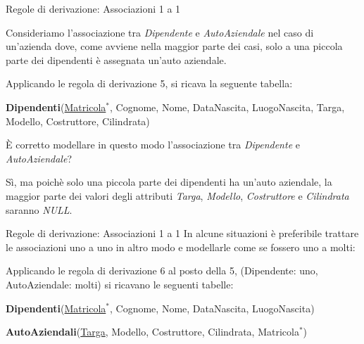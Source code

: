 \begin{frame}{Regole di derivazione: Associazioni 1 a 1}
\begin{minipage}{0.9\textwidth}
Consideriamo l'associazione tra \textit{Dipendente} e \textit{AutoAziendale} nel caso di un'azienda dove, come avviene nella maggior parte dei casi, solo a una piccola parte dei dipendenti \`e assegnata un'auto aziendale.
\end{minipage}
\pause
\begin{center}
\ERDipendenteAutoAziendale
\end{center}
\pause

Applicando le regola di derivazione 5, si ricava la seguente tabella:
\pause

\textbf{Dipendenti}(\underline{Matricola}$^*$, Cognome, Nome, DataNascita, LuogoNascita, Targa, Modello, Costruttore, Cilindrata)
\pause

\`E corretto modellare in questo modo l'associazione tra \textit{Dipendente} e \textit{AutoAziendale}?
\pause

S\`i, ma poich\`e solo una piccola parte dei dipendenti ha un'auto aziendale, la maggior parte dei valori degli attributi \textit{Targa}, \textit{Modello}, \textit{Costruttore} e \textit{Cilindrata} saranno \textit{NULL}.
\end{frame}
%
\begin{frame}{Regole di derivazione: Associazioni 1 a 1}
In alcune situazioni \`e preferibile trattare le associazioni uno a uno in altro modo e modellarle come se fossero uno a molti:
\pause
\begin{center}
\ERDipendenteAutoAziendale
\end{center}
\pause

Applicando le regola di derivazione 6 al posto della 5, (Dipendente: uno, AutoAziendale: molti) si ricavano le seguenti tabelle:
\pause

\textbf{Dipendenti}(\underline{Matricola}$^*$, Cognome, Nome, DataNascita, LuogoNascita)
\pause

\textbf{AutoAziendali}(\underline{Targa}, Modello, Costruttore, Cilindrata, Matricola$^*$)
\end{frame}
%
